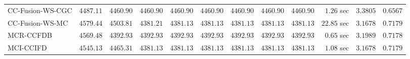 \begin{table}[H]
\begin{tabular}{lrrrrrrrrrrr}
    CC-Fusion-WS-CGC & $      4487.11$ & $      4460.90$ & $      4460.90$ & $      4460.90$ & $      4460.90$ & $      4460.90$ & $      4460.90$ & $      4460.90$ & $         1.26$ sec    & $       3.3805$  & $       0.6567$ \\ 
     CC-Fusion-WS-MC & $      4579.44$ & $      4503.81$ & $      4381.21$ & $      4381.13$ & $      4381.13$ & $      4381.13$ & $      4381.13$ & $      4381.13$ & $        22.85$ sec    & $       3.1678$  & $       0.7179$ \\ 
\cmidrule{1-1} 
           MCR-CCFDB & $      4569.48$ & $      4392.93$ & $      4392.93$ & $      4392.93$ & $      4392.93$ & $      4392.93$ & $      4392.93$ & $      4392.93$ & $         0.65$ sec    & $       3.1989$  & $       0.7178$ \\ 
\cmidrule{1-1} 
           MCI-CCIFD & $      4545.13$ & $      4465.31$ & $      4381.13$ & $      4381.13$ & $      4381.13$ & $      4381.13$ & $      4381.13$ & $      4381.13$ & $         1.08$ sec    & $       3.1678$  & $       0.7179$ \\ 
\bottomrule
\end{tabular}
\end{table}

